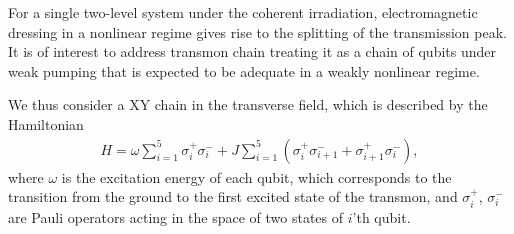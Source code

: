 \documentclass[%
 aps, pra,
 amsmath,amssymb,
 preprint,%
superscriptaddress
]{revtex4-2}
\begin{document}
For a single two-level system under the coherent irradiation, electromagnetic dressing in a nonlinear regime gives rise to the splitting of the transmission peak. It is of interest to address transmon chain treating it as a chain of qubits under weak pumping that is expected to be adequate in a weakly nonlinear regime.

We thus consider a XY chain in the transverse field, which is described
by the Hamiltonian
\begin{eqnarray}
H = \omega \sum_{i=1}^{5} \sigma_i^{+} \sigma_i^{-} + J
\sum_{i=1}^{5}(\sigma_i^{+} \sigma_{i+1}^{-} + \sigma_{i+1}^{+}
\sigma_i^{-}),
\label{Hamiltonian}
\end{eqnarray}
where $\omega$ is the excitation energy of each qubit, which corresponds to the transition from the ground to the first excited state of the transmon, and $\sigma_i^{+}$, $\sigma_i^{-}$ are Pauli operators acting in the space of two states of $i$'th qubit.
\end{document}

